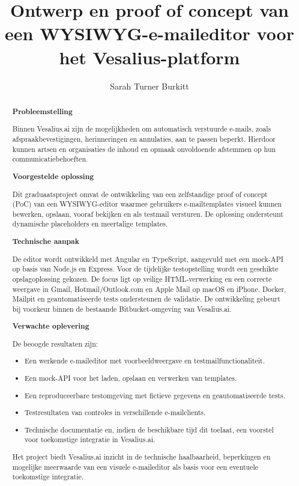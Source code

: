 \documentclass{hogent-article}
\title{Ontwerp en proof of concept van een WYSIWYG-e-maileditor voor het Vesalius-platform}
\author{Sarah Turner Burkitt}
\begin{document}
\begin{abstract}

\noindent\textbf{Probleemstelling}

Binnen Vesalius.ai zijn de mogelijkheden om automatisch verstuurde
e-mails, zoals afspraakbevestigingen, herinneringen en annulaties,
aan te passen beperkt. Hierdoor kunnen artsen en organisaties de
inhoud en opmaak onvoldoende afstemmen op hun communicatiebehoeften.

\medskip
\noindent\textbf{Voorgestelde oplossing}

Dit graduaatsproject omvat de ontwikkeling van een zelfstandige
proof of concept (PoC) van een WYSIWYG-editor waarmee gebruikers
e-mailtemplates visueel kunnen bewerken, opslaan, vooraf bekijken
en als testmail versturen. De oplossing ondersteunt dynamische
placeholders en meertalige templates.

\medskip
\noindent\textbf{Technische aanpak}

De editor wordt ontwikkeld met Angular en TypeScript, aangevuld
met een mock-API op basis van Node.js en Express. Voor de tijdelijke
testopstelling wordt een geschikte opslagoplossing gekozen.
De focus ligt op veilige HTML-verwerking en een correcte weergave
in Gmail, Hotmail/Outlook.com en Apple Mail op macOS en iPhone.
Docker, Mailpit en geautomatiseerde tests ondersteunen de validatie.
De ontwikkeling gebeurt bij voorkeur binnen de bestaande
Bitbucket-omgeving van Vesalius.ai.

\medskip
\noindent\textbf{Verwachte oplevering}

De beoogde resultaten zijn:
\begin{itemize}
    \item Een werkende e-maileditor met voorbeeldweergave en
    testmailfunctionaliteit.
    \item Een mock-API voor het laden, opslaan en verwerken van templates.
    \item Een reproduceerbare testomgeving met fictieve gegevens
    en geautomatiseerde tests.
    \item Testresultaten van controles in verschillende e-mailclients.
    \item Technische documentatie en, indien de beschikbare tijd
    dit toelaat, een voorstel voor toekomstige integratie in Vesalius.ai.
\end{itemize}

Het project biedt Vesalius.ai inzicht in de technische haalbaarheid,
beperkingen en mogelijke meerwaarde van een visuele e-maileditor
als basis voor een eventuele toekomstige integratie.

\end{abstract}



\printbibliography[heading=bibintoc]
\end{document}
